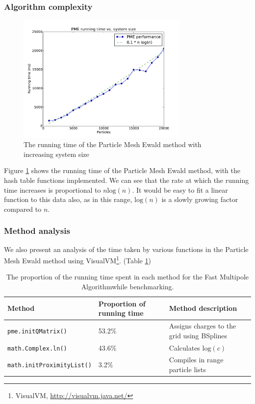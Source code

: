 \documentclass[pdftex,twoside,a4paper]{report}
\newcommand{\bcen}{\begin{center}}
\newcommand{\ecen}{\end{center}}
\newcommand{\pmem}{Particle Mesh Ewald method}
\newcommand{\fma}{Fast Multipole Algorithm}
\begin{document}
\subsubsection{Algorithm complexity}
\begin{figure}
\bcen \includegraphics[width=0.75\textwidth]{figures/graphs/pme_algo_complex.pdf} \ecen
\caption{The running time of the \pmem{} with increasing system size}
\label{fig:pme_alg_complex}
\end{figure}
Figure \ref{fig:pme_alg_complex} shows the running time of the \pmem{}, with the hash table functions implemented. We can see that the rate at which the running time increases is proportional to $n\text{log}(n)$. It would be easy to fit a linear function to this data also, as in this range, $\text{log}(n)$ is a slowly growing factor compared to $n$.
\subsubsection{Method analysis}
We also present an analysis of the time taken by various functions in the \pmem{} using VisualVM\footnote{VisualVM, \url{http://visualvm.java.net/}}. (Table \ref{tab:pme_time_breakdown})
\begin{table}[h]
    \begin{tabular}{|l|l|l|}
        Method                       & Proportion of running time & Method description \\ \hline
        \texttt{pme.initQMatrix()}         & 53.2\%                      & Assigns charges to the grid using BSplines        \\ 
        \texttt{math.Complex.ln()}         & 43.6\%                      & Calculates $\text{log}(c)$             \\ 
        \texttt{math.initProximityList()}            & 3.2\%                      &  Compiles in range particle lists\\
    \end{tabular}
    \caption{The proportion of the running time spent in each method for the \fma while benchmarking.}
        \label{tab:pme_time_breakdown}
\end{table}
\end{document}

